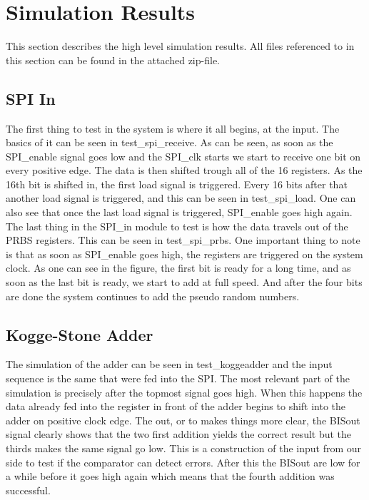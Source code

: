 \section{Simulation Results} \label{sec:simulation_results}
This section describes the high level simulation results. All files referenced to in this section can be found in the attached zip-file.
\subsection{SPI In}
The first thing to test in the system is where it all begins, at the input. The basics of it can be seen in test\_spi\_receive. As can be seen, as soon as the SPI\_enable signal goes low and the SPI\_clk starts we start to receive one bit on every positive edge. The data is then shifted trough all of the 16 registers. As the 16th bit is shifted in, the first load signal is triggered. Every 16 bits after that another load signal is triggered, and this can be seen in test\_spi\_load. One can also see that once the last load signal is triggered, SPI\_enable goes high again.\\
The last thing in the SPI\_in module to test is how the data travels out of the PRBS registers. This can be seen in test\_spi\_prbs. One important thing to note is that as soon as SPI\_enable goes high, the registers are triggered on the system clock. As one can see in the figure, the first bit is ready for a long time, and as soon as the last bit is ready, we start to add at full speed. And after the four bits are done the system continues to add the pseudo random numbers. 

\subsection{Kogge-Stone Adder}
The simulation of the adder can be seen in test\_koggeadder and the input sequence is the same that were fed into the SPI. The most relevant part of the simulation is precisely after the topmost signal goes high. When this happens the data already fed into the register in front of the adder begins to shift into the adder on positive clock edge. The out, or to makes things more clear, the BISout signal clearly shows that the two first addition yields the correct result but the thirds makes the same signal go low. This is a construction of the input from our side to test if the comparator can detect errors. After this the BISout are low for a while before it goes high again which means that the fourth addition was successful.

